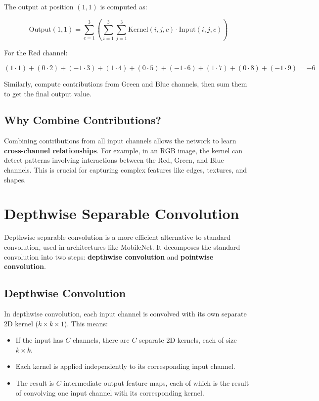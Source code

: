 \begin{notechapter}
The output at position \((1, 1)\) is computed as:

\[
\text{Output}(1, 1) = \sum_{c=1}^{3} \left( \sum_{i=1}^{3} \sum_{j=1}^{3} 
\text{Kernel}(i, j, c) \cdot \text{Input}(i, j, c) \right)
\]

For the Red channel:

\[
(1 \cdot 1) + (0 \cdot 2) + (-1 \cdot 3) + (1 \cdot 4) + (0 \cdot 5) 
+ (-1 \cdot 6) + (1 \cdot 7) + (0 \cdot 8) + (-1 \cdot 9) = -6
\]

Similarly, compute contributions from Green and Blue channels, then 
sum them to get the final output value.

\subsection{Why Combine Contributions?}

Combining contributions from all input channels allows the network 
to learn \textbf{cross-channel relationships}. For example, in an RGB 
image, the kernel can detect patterns involving interactions between 
the Red, Green, and Blue channels. This is crucial for capturing 
complex features like edges, textures, and shapes.

\section{Depthwise Separable Convolution}

Depthwise separable convolution is a more efficient alternative to 
standard convolution, used in architectures like MobileNet. It 
decomposes the standard convolution into two steps: \textbf{depthwise 
convolution} and \textbf{pointwise convolution}.

\subsection{Depthwise Convolution}

In depthwise convolution, each input channel is convolved with its 
own separate 2D kernel (\(k \times k \times 1\)). This means:
\begin{itemize}
    \item If the input has \(C\) channels, there are \(C\) separate 
    2D kernels, each of size \(k \times k\).
    \item Each kernel is applied independently to its corresponding 
    input channel.
    \item The result is \(C\) intermediate output feature maps, each 
    of which is the result of convolving one input channel with its 
    corresponding kernel.
\end{itemize}


\end{notechapter}
